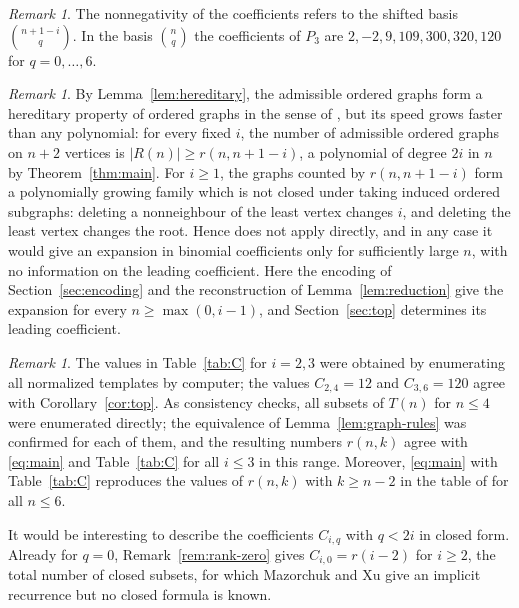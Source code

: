 \documentclass[11pt]{amsart}
\theoremstyle{definition}
\theoremstyle{remark}
\newtheorem{remark}[theorem]{Remark}
\numberwithin{equation}{section}
\begin{document}
\begin{remark}\label{rem:basis}
The nonnegativity of the coefficients refers to the shifted basis $\binom{n+1-i}{q}$. In the basis $\binom{n}{q}$ the coefficients of $P_3$ are $2,-2,9,109,300,320,120$ for $q=0,\dots,6$.
\end{remark}

\begin{remark}\label{rem:BBM}
By Lemma~\ref{lem:hereditary}, the admissible ordered graphs form a hereditary property of ordered graphs in the sense of \cite{BBM}, but its speed grows faster than any polynomial: for every fixed $i$, the number of admissible ordered graphs on $n+2$ vertices is $|R(n)|\ge r(n,n+1-i)$, a polynomial of degree $2i$ in $n$ by Theorem~\ref{thm:main}. For $i\ge1$, the graphs counted by $r(n,n+1-i)$ form a polynomially growing family which is not closed under taking induced ordered subgraphs: deleting a nonneighbour of the least vertex changes $i$, and deleting the least vertex changes the root. Hence \cite[Theorem~12]{BBM} does not apply directly, and in any case it would give an expansion in binomial coefficients only for sufficiently large $n$, with no information on the leading coefficient. Here the encoding of Section~\ref{sec:encoding} and the reconstruction of Lemma~\ref{lem:reduction} give the expansion for every $n\ge\max(0,i-1)$, and Section~\ref{sec:top} determines its leading coefficient.
\end{remark}

\begin{remark}\label{rem:computations}
The values in Table~\ref{tab:C} for $i=2,3$ were obtained by enumerating all normalized templates by computer; the values $C_{2,4}=12$ and $C_{3,6}=120$ agree with Corollary~\ref{cor:top}. As consistency checks, all subsets of $T(n)$ for $n\le4$ were enumerated directly; the equivalence of Lemma~\ref{lem:graph-rules} was confirmed for each of them, and the resulting numbers $r(n,k)$ agree with \eqref{eq:main} and Table~\ref{tab:C} for all $i\le3$ in this range. Moreover, \eqref{eq:main} with Table~\ref{tab:C} reproduces the values of $r(n,k)$ with $k\ge n-2$ in the table of \cite[Section~5.1]{MX} for all $n\le6$.
\end{remark}

It would be interesting to describe the coefficients $C_{i,q}$ with $q<2i$ in closed form. Already for $q=0$, Remark~\ref{rem:rank-zero} gives $C_{i,0}=r(i-2)$ for $i\ge2$, the total number of closed subsets, for which Mazorchuk and Xu give an implicit recurrence \cite[Theorem~18]{MX} but no closed formula is known.
\end{document}
